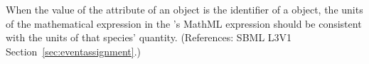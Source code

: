 When the value of the attribute  of an \EventAssignment
object is the identifier of a \Species object, the units of the
mathematical expression in the \EventAssignment's MathML 
expression should be consistent with the units of that species' quantity.
(References: SBML L3V1 Section~\ref{sec:eventassignment}.)

